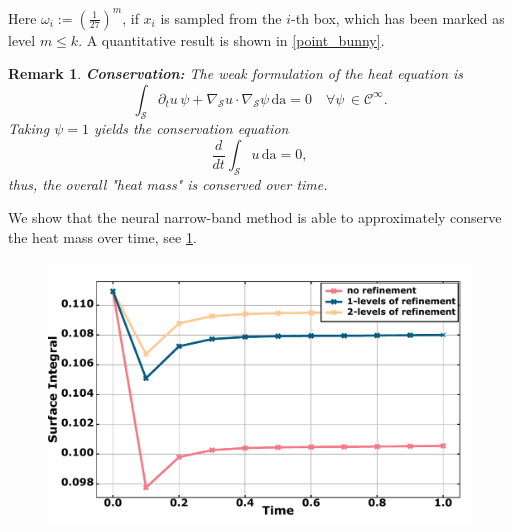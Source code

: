 \documentclass[12pt,openany]{book}
\def\S{\mathcal{S}}
\theoremstyle{plainnormal}
\newtheorem{remark}[theorem]{Remark}
\theoremstyle{remark}
\begin{document}
Here $\omega_i:= (\frac{1}{27})^m$, if $x_i$ is sampled from the $i$-th box, which has been marked as level $m\leq k$. A quantitative result is shown in \cref{point_bunny}.
\begin{remark}\textbf{Conservation:}
    The weak formulation of the heat equation is \[
        \int_\mathcal{S} \partial_t u \, \psi + \nabla_\mathcal{S} u \cdot \nabla_\mathcal{S} \psi \, \mathrm{da} = 0 \quad \forall \psi\,\in \mathcal C^\infty.
    \]
    Taking $\psi = 1$ yields the conservation equation
    $$\frac{d}{dt} \int_\S  u \,\mathrm{da} = 0,$$
    thus, the overall "heat mass" is conserved over time.
\end{remark}
 We show that the neural narrow-band method is able to approximately conserve the heat mass over time, see \cref{mass_conservation}.
 \begin{figure}[htbp]
  \centering
  \begin{minipage}[l]{0.7\textwidth}
    \includegraphics[width=\linewidth]{Figures/heatflow_conservation}
  \end{minipage}%
  \hfill
  \begin{minipage}[r]{0.29\textwidth}
    \label{mass_conservation}
  \end{minipage}
\end{figure}
\FloatBarrier
\end{document}
